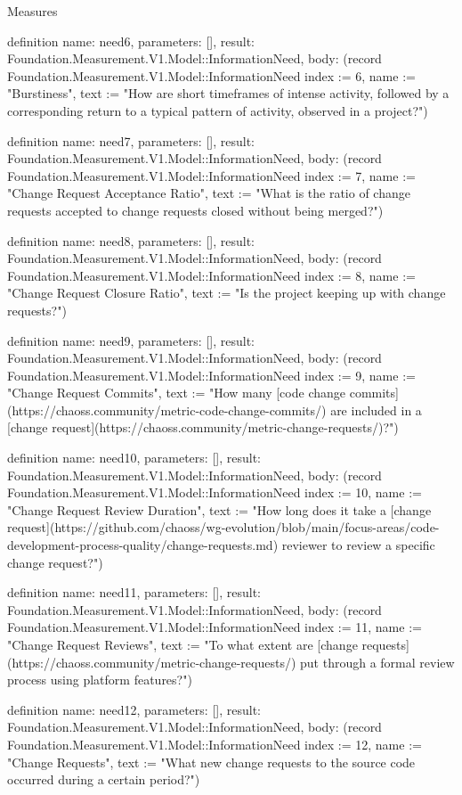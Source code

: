\begin{lexlean}{Measures}
\begin{semanticmodule}
definition{
  name: need6,
  parameters: [],
  result: Foundation.Measurement.V1.Model::InformationNeed,
  body: (record Foundation.Measurement.V1.Model::InformationNeed {index := 6, name := "Burstiness", text := "How are short timeframes of intense activity, followed by a corresponding return to a typical pattern of activity, observed in a project?"})
}

definition{
  name: need7,
  parameters: [],
  result: Foundation.Measurement.V1.Model::InformationNeed,
  body: (record Foundation.Measurement.V1.Model::InformationNeed {index := 7, name := "Change Request Acceptance Ratio", text := "What is the ratio of change requests accepted to change requests closed without being merged?"})
}

definition{
  name: need8,
  parameters: [],
  result: Foundation.Measurement.V1.Model::InformationNeed,
  body: (record Foundation.Measurement.V1.Model::InformationNeed {index := 8, name := "Change Request Closure Ratio", text := "Is the project keeping up with change requests?"})
}

definition{
  name: need9,
  parameters: [],
  result: Foundation.Measurement.V1.Model::InformationNeed,
  body: (record Foundation.Measurement.V1.Model::InformationNeed {index := 9, name := "Change Request Commits", text := "How many [code change commits](https://chaoss.community/metric-code-change-commits/) are included in a [change request](https://chaoss.community/metric-change-requests/)?"})
}

definition{
  name: need10,
  parameters: [],
  result: Foundation.Measurement.V1.Model::InformationNeed,
  body: (record Foundation.Measurement.V1.Model::InformationNeed {index := 10, name := "Change Request Review Duration", text := "How long does it take a [change request](https://github.com/chaoss/wg-evolution/blob/main/focus-areas/code-development-process-quality/change-requests.md) reviewer to review a specific change request?"})
}

definition{
  name: need11,
  parameters: [],
  result: Foundation.Measurement.V1.Model::InformationNeed,
  body: (record Foundation.Measurement.V1.Model::InformationNeed {index := 11, name := "Change Request Reviews", text := "To what extent are [change requests](https://chaoss.community/metric-change-requests/) put through a formal review process using platform features?"})
}

definition{
  name: need12,
  parameters: [],
  result: Foundation.Measurement.V1.Model::InformationNeed,
  body: (record Foundation.Measurement.V1.Model::InformationNeed {index := 12, name := "Change Requests", text := "What new change requests to the source code occurred during a certain period?"})
}


\end{semanticmodule}
\end{lexlean}
